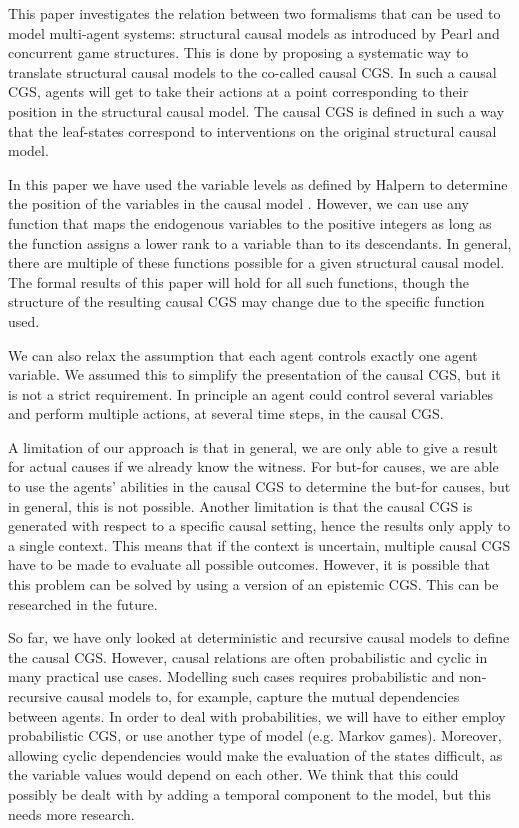 This paper investigates the relation between two formalisms that can be used to model multi-agent systems: structural causal models as introduced by Pearl \cite{pearl1995causal} and concurrent game structures. This is done by proposing a systematic way to translate structural causal models to the co-called causal CGS.  
In such a causal CGS, agents will get to take their actions at a point corresponding to their position in the structural causal model. 
The causal CGS is defined in such a way that the leaf-states correspond to interventions on the original structural causal model.

In this paper we have used the variable levels as defined by Halpern to determine the position of the variables in the causal model \cite{halpern2016actual}. 
However, we can use any function that maps the endogenous variables to the positive integers as long as the function assigns a lower rank to a variable than to its descendants. In general, there are multiple of these functions possible for a given structural causal model. 
The formal results of this paper will hold for all such functions, though the structure of the resulting causal CGS may change due to the specific function used.


We can also relax the assumption that each agent controls exactly one agent variable. 
We assumed this to simplify the presentation of the causal CGS, but it is not a strict requirement. 
In principle an agent could control several variables and perform multiple actions, at several time steps, in the causal CGS. 



A limitation of our approach is that in general, we are only able to give a result for actual causes if we already know the witness. For but-for causes, we are able to use the agents' abilities in the causal CGS to determine the but-for causes, 
but in general, this is not possible.
Another limitation is that the causal CGS is generated with respect to a specific causal setting, hence the results only apply to a single context. This means that if the context is uncertain, multiple causal CGS have to be made to evaluate all possible outcomes. However, it is possible that this problem can be solved by using a version of an epistemic CGS. This can be researched in the future.

So far, we have only looked at deterministic and recursive causal models to define the causal CGS.
However, causal relations are often probabilistic and cyclic in many practical use cases. Modelling such cases requires probabilistic and non-recursive causal models to, for example, capture the mutual dependencies between agents.
In order to deal with probabilities, we will have to either employ probabilistic CGS, or use another type of model (e.g. Markov games).
Moreover, allowing cyclic dependencies would make the evaluation of the states difficult, as the variable values would depend on each other.
We think that this could possibly be dealt with by adding a temporal component to the model, but this needs more research.

